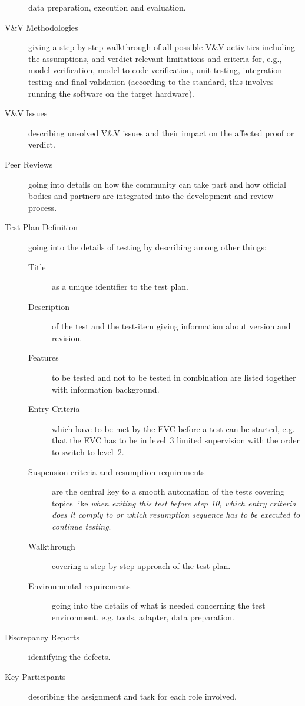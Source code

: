 \begin{description}
  data preparation, execution and evaluation. 
\item[V\&V Methodologies] giving a step-by-step walkthrough of all
  possible V\&V activities including the assumptions, and
  verdict-relevant limitations and criteria for, e.g.,  model
  verification, model-to-code verification, unit testing, integration
  testing and final validation (according to the standard, this
  involves running the software on the target hardware).  
\item[V\&V Issues] describing unsolved V\&V issues and their impact on
  the affected proof or verdict. 
\item[Peer Reviews] going into details on how the community can take
  part and how official bodies and partners are integrated into the
  development and review process. 
\item[Test Plan Definition] going into the details of testing by
  describing among other things: 

\begin{description} 
\item[Title] as a unique identifier to the test plan.
\item[Description] of the test and the test-item giving information
  about version and revision. 
\item[Features] to be tested and not to be tested in combination are
  listed together with information background.  
\item[Entry Criteria] which have to be met by the EVC before a test
  can be started, e.g. that the EVC has to be in level~3 limited
  supervision with the order to switch to level~2. 
\item[Suspension criteria and resumption requirements] are the central
  key to a smooth automation of the tests covering topics like
  \emph{when exiting this test before step 10, which entry criteria
    does it comply to or which resumption sequence has to be executed
    to continue testing}. 
\item[Walkthrough] covering a step-by-step approach of the test plan.
\item[Environmental requirements] going into the details of what is
  needed concerning the test environment, e.g. tools, adapter, data
  preparation. 
\end{description}

\item[Discrepancy Reports] identifying the defects.
\item[Key Participants] describing the assignment and task for each
  role involved.  


\end{description}
